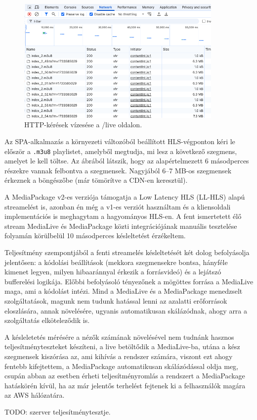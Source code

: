\begin{figure}[h]
  \centering
  \includegraphics[width=100mm, keepaspectratio]{figures/waterfall2.png}
  \caption{HTTP-kérések vízesése a /live oldalon.}
  \label{fig:waterfall2}
\end{figure}

Az SPA-alkalmazás a környezeti változóból beállított HLS-végponton kéri le először a \verb|.m3u8| playlistet, amelyből megtudja, mi lesz a következő szegmens, amelyet le kell töltse. Az ábrából látszik, hogy az alapértelmezett 6 másodperces részekre vannak felbontva a szegmensek. Nagyjából 6--7 MB-os szegmensek érkeznek a böngészőbe (már tömörítve a CDN-en keresztül).

A MediaPackage v2-es verziója támogatja a Low Latency HLS (LL-HLS) alapú streamelést is, azonban én még a v1-es verziót használtam és a kliensoldali implementációs is meghagytam a hagyományos HLS-en. A fent ismertetett élő stream MediaLive és MediaPackage közti integrációjának manuális tesztelése folyamán körülbelül 10 másodperces késleltetést érzékeltem.

Teljesítmény szempontjából a fenti streamelés késleltetését két dolog befolyásolja jelentősen: a kódolási beállítások (mekkora szegmensekre bontsa, hányféle kimenet legyen, milyen hibaaránnyal érkezik a forrásvideó) és a lejátszó bufferelési logikája. Előbbi befolyásoló tényezőnek a mögöttes forrása a MediaLive maga, ami a kódolást intézi. Mind a MediaLive és a MediaPackage menedzselt szolgáltatások, magunk nem tudunk hatással lenni az azalatti erőforrások eloszlására, annak növelésére, ugyanis automatikusan skálázódnak, ahogy arra a szolgáltatás elköteleződik is.

A késleletetés mérésére a nézők számának növelésével nem tudnánk hasznos teljesítményteszteket készíteni, a live betöltődik a MediaLive-ba, utána a kész szegmensek kiszórása az, ami kihívás a rendszer számára, viszont ezt ahogy fentebb kifejtettem, a MediaPackage automatikusan skálázódással oldja meg, csupán abban az esetben érheti teljesítményromlás a rendszert a MediaPackage hatáskörén kívül, ha az már jelentős terhelést fejtenek ki a felhasználók magára az AWS hálózatára.\cite{latency}

TODO: szerver teljesítménytesztje.
